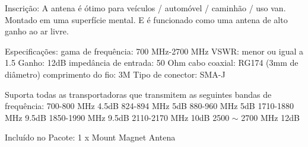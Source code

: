 \documentclass[
  12pt,				%
  openright,			%
  twoside,			%
  a4paper,			%
  english,			%
  french,				%
  spanish,			%
  brazil,				%
  ]{abntex2}
\begin{document}

Inscrição:
A antena é ótimo para veículos / automóvel / caminhão / uso van. Montado em uma superfície mental. E é funcionado como uma antena de alto ganho ao ar livre.

Especificações:
gama de frequência: 700 MHz-2700 MHz
VSWR: menor ou igual a 1.5
Ganho: 12dB
impedância de entrada: 50 Ohm
cabo coaxial: RG174 (3mm de diâmetro)
comprimento do fio: 3M
Tipo de conector: SMA-J

Suporta todas as transportadoras que transmitem as seguintes bandas de frequência:
700-800 MHz 4.5dB
824-894 MHz 5dB
880-960 MHz 5dB
1710-1880 MHz 9.5dB
1850-1990 MHz 9.5dB
2110-2170 MHz 10dB
2500 $\sim$ 2700 MHz 12dB

Incluído no Pacote:
1 x Mount Magnet Antena
\end{document}
